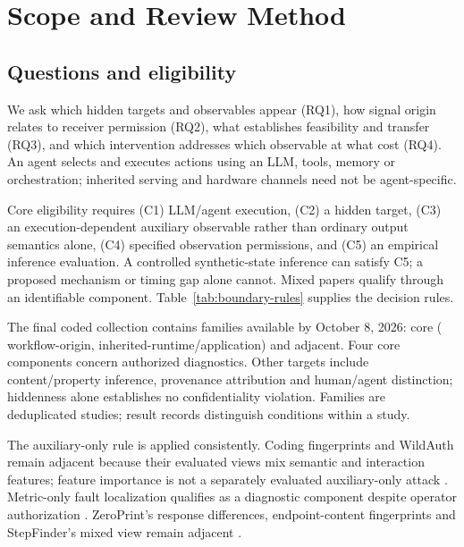 \section{Scope and Review Method}\label{sec:methodology}\label{sec:background}
\subsection{Questions and eligibility}
We ask which hidden targets and observables appear (RQ1), how signal origin relates to receiver permission (RQ2), what establishes feasibility and transfer (RQ3), and which intervention addresses which observable at what cost (RQ4). An agent selects and executes actions using an LLM, tools, memory or orchestration; inherited serving and hardware channels need not be agent-specific.

Core eligibility requires (C1) LLM/agent execution, (C2) a hidden target, (C3) an execution-dependent auxiliary observable rather than ordinary output semantics alone, (C4) specified observation permissions, and (C5) an empirical inference evaluation. A controlled synthetic-state inference can satisfy C5; a proposed mechanism or timing gap alone cannot. Mixed papers qualify through an identifiable component. Table~\ref{tab:boundary-rules} supplies the decision rules.


The final coded collection contains \FinalN{} families available by October 8, 2026: \FinalCore{} core (\FinalA{} workflow-origin, \FinalB{} inherited-runtime/application) and \FinalAdjacent{} adjacent. Four core components concern authorized diagnostics. Other targets include content/property inference, provenance attribution and human/agent distinction; hiddenness alone establishes no confidentiality violation. Families are deduplicated studies; result records distinguish conditions within a study.

The auxiliary-only rule is applied consistently. Coding fingerprints and WildAuth remain adjacent because their evaluated views mix semantic and interaction features; feature importance is not a separately evaluated auxiliary-only attack \cite{ghaleb2026codingfingerprint,wang2026dialogue}. Metric-only fault localization qualifies as a diagnostic component despite operator authorization \cite{scheinert2026rca}. ZeroPrint's response differences, endpoint-content fingerprints and StepFinder's mixed view remain adjacent \cite{shao2026zeroprint,leshin2026endpoint,zhu2026stepfinder}.


